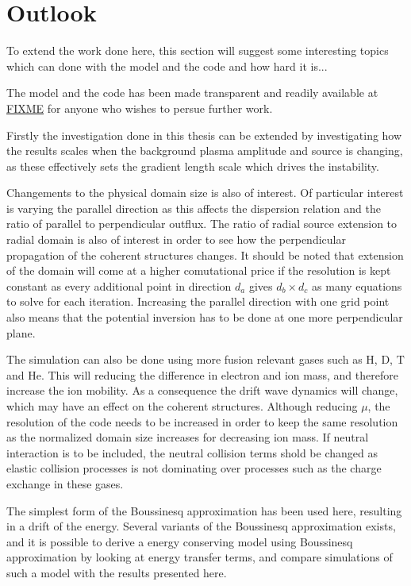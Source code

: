 \section*{Outlook}
%
To extend the work done here, this section will suggest some interesting topics which can done with the model and the code and how hard it is...

The model and the code has been made transparent and readily available at \href{FIXME}{FIXME} for anyone who wishes to persue further work.

Firstly the investigation done in this thesis can be extended by investigating how the results scales when the background plasma amplitude and source is changing, as these effectively sets the gradient length scale which drives the instability.

Changements to the physical domain size is also of interest.
Of particular interest is varying the parallel direction as this affects the dispersion relation and the ratio of parallel to perpendicular outflux.
The ratio of radial source extension to radial domain is also of interest in order to see how the perpendicular propagation of the coherent structures changes.
It should be noted that extension of the domain will come at a higher comutational price if the resolution is kept constant as every additional point in direction $d_a$ gives $d_b\times d_c$ as many equations to solve for each iteration.
Increasing the parallel direction with one grid point also means that the potential inversion has to be done at one more perpendicular plane.

The simulation can also be done using more fusion relevant gases such as $\text{H}$, $\text{D}$, $\text{T}$ and $\text{He}$.
This will reducing the difference in electron and ion mass, and therefore increase the ion mobility.
As a consequence the drift wave dynamics will change, which may have an effect on the coherent structures.
Although reducing $\mu$, the resolution of the code needs to be increased in order to keep the same resolution as the normalized domain size increases for decreasing ion mass.
If neutral interaction is to be included, the neutral collision terms shold be changed as elastic collision processes is not dominating over processes such as the charge exchange in these gases.

The simplest form of the Boussinesq approximation has been used here, resulting in a drift of the energy.
Several variants of the Boussinesq approximation exists, and it is possible to derive a energy conserving model using Boussinesq approximation by looking at energy transfer terms, and compare simulations of such a model with the results presented here.

